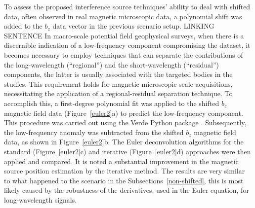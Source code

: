 To assess the proposed interference source techniques' ability to deal with shifted data, often observed in real magnetic microscopic data, a polynomial shift was added to the $b_z$ data vector in the previous scenario setup. 
LINKING SENTENCE
In macro-scale potential field geophysical surveys, when there is a discernible indication of a low-frequency component compromising the dataset, it becomes necessary to employ techniques that can separate the contributions of the long-wavelength (``regional'') and the short-wavelength (``residual'') components, the latter is usually associated with the targeted bodies in the studies. This requirement holds for magnetic microscopic scale acquisitions, necessitating the application of a regional-residual separation technique. To accomplish this, a first-degree polynomial fit was applied to the shifted $b_z$ magnetic field data (Figure~\ref{euler2}a) to predict the low-frequency component. This procedure was carried out using the Verde Python package \citep{verde2018}. Subsequently, the low-frequency anomaly was subtracted from the shifted $b_z$ magnetic field data, as shown in Figure~\ref{euler2}b. The Euler deconvolution algorithms for the standard (Figure~\ref{euler2}c) and iterative (Figure~\ref{euler2}d) approaches were then applied and compared. It is noted a substantial improvement in the magnetic source position estimation by the iterative method. The results are very similar to what happened to the scenario in the Subsections~\ref{non-shifted}, this is most likely caused by the robustness of the derivatives, used in the Euler equation, for long-wavelength signals.

